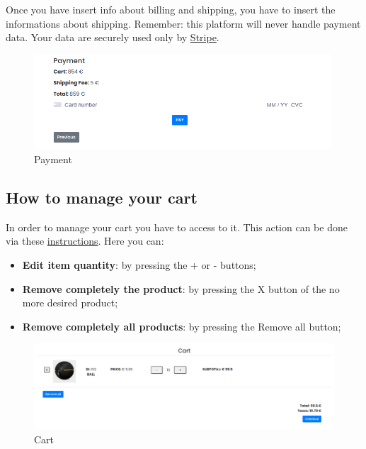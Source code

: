Once you have insert info about billing and shipping, you have to insert the informations about shipping.
Remember: this platform will never handle payment data. Your data are securely used only by \href{https://stripe.com}{Stripe}.
\begin{figure}[H]
    \centering
    \includegraphics[width=30em]{res/images/cliente/checkoutpay.png}
    \caption{Payment}
\end{figure}

\subsection{How to manage your cart} \label{_cart}
In order to manage your cart you have to access to it. This action can be done via these \hyperref[_checkcart]{instructions}.
Here you can:
\begin{itemize} 
    \item \textbf{Edit item quantity}: by pressing the + or - buttons;
    \item \textbf{Remove completely the product}: by pressing the X button of the no more desired product;
    \item \textbf{Remove completely all products}: by pressing the Remove all button;  
\end{itemize}
\begin{figure}[H]
    \centering
    \includegraphics[width=\linewidth]{res/images/cliente/cart.png}
    \caption{Cart}
\end{figure}

